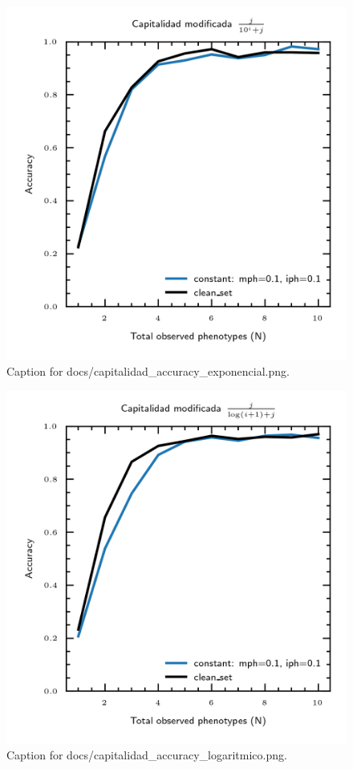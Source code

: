 \documentclass{article}
\begin{document}
\begin{figure}[h] \centering \includegraphics{docs/capitalidad_accuracy_exponencial.png} \caption{Caption for docs/capitalidad_accuracy_exponencial.png.} \end{figure}
\begin{figure}[h] \centering \includegraphics{docs/capitalidad_accuracy_logaritmico.png} \caption{Caption for docs/capitalidad_accuracy_logaritmico.png.} \end{figure}
\end{document}
